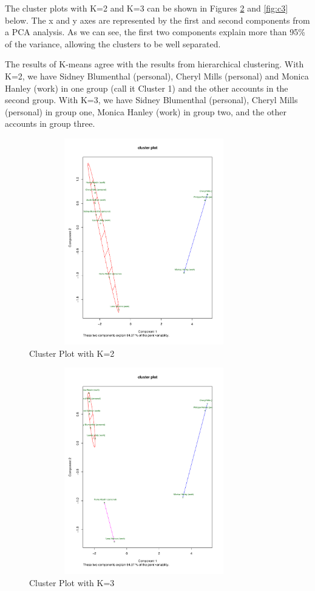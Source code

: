 The cluster plots with K=2 and K=3 can be shown in Figures \ref{fig:c2} and \ref{fig:c3} below. The x and y axes are represented by the first and second components from a PCA analysis. As we can see, the first two components explain more than 95\% of the variance, allowing the clusters to be well separated. 

The results of K-means agree with the results from hierarchical clustering. With K=2, we have Sidney Blumenthal (personal), Cheryl Mills (personal) and Monica Hanley (work) in one group (call it Cluster 1) and the other accounts in the second group. With K=3, we have Sidney Blumenthal (personal), Cheryl Mills (personal) in group one, Monica Hanley (work) in group two, and the other accounts in group three.

\begin{figure}[h!]
    \centering
    \includegraphics[width=10cm,height=9cm]
    {daitong_and_yihe/c2.pdf}
    \caption{Cluster Plot with K=2}
    \label{fig:c2}
\end{figure}

\begin{figure}[h!]
    \centering
    \includegraphics[width=10cm,height=9cm]
    {daitong_and_yihe/c3.pdf}
    \caption{Cluster Plot with K=3}
    \label{fig:c2}
\end{figure}

